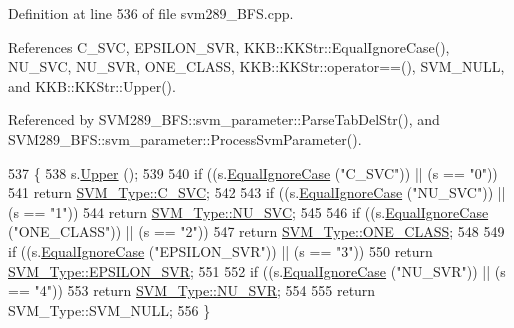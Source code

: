 Definition at line 536 of file svm289\+\_\+\+B\+F\+S.\+cpp.



References C\+\_\+\+S\+VC, E\+P\+S\+I\+L\+O\+N\+\_\+\+S\+VR, K\+K\+B\+::\+K\+K\+Str\+::\+Equal\+Ignore\+Case(), N\+U\+\_\+\+S\+VC, N\+U\+\_\+\+S\+VR, O\+N\+E\+\_\+\+C\+L\+A\+SS, K\+K\+B\+::\+K\+K\+Str\+::operator==(), S\+V\+M\+\_\+\+N\+U\+LL, and K\+K\+B\+::\+K\+K\+Str\+::\+Upper().



Referenced by S\+V\+M289\+\_\+\+B\+F\+S\+::svm\+\_\+parameter\+::\+Parse\+Tab\+Del\+Str(), and S\+V\+M289\+\_\+\+B\+F\+S\+::svm\+\_\+parameter\+::\+Process\+Svm\+Parameter().


\begin{DoxyCode}
537 \{
538   s.\hyperlink{class_k_k_b_1_1_k_k_str_a66ea0feabc94da88591b56a683695bd9}{Upper} ();
539 
540   \textcolor{keywordflow}{if}  ((s.\hyperlink{class_k_k_b_1_1_k_k_str_a562f9696417c53f66bc4088eac072ab5}{EqualIgnoreCase} (\textcolor{stringliteral}{"C\_SVC"}))       ||  (s == \textcolor{stringliteral}{"0"}))
541     \textcolor{keywordflow}{return} \hyperlink{namespace_s_v_m233_acde4c278f323c82a6b41c27f6f30738aa942f03bda3ae7dbb9e945f161c95ab97}{SVM\_Type::C\_SVC};
542 
543   \textcolor{keywordflow}{if}  ((s.\hyperlink{class_k_k_b_1_1_k_k_str_a562f9696417c53f66bc4088eac072ab5}{EqualIgnoreCase} (\textcolor{stringliteral}{"NU\_SVC"}))       ||  (s == \textcolor{stringliteral}{"1"}))
544     \textcolor{keywordflow}{return} \hyperlink{namespace_s_v_m233_acde4c278f323c82a6b41c27f6f30738aa7705bf71b9d3c7169b4d201acb2b30b8}{SVM\_Type::NU\_SVC};
545 
546   \textcolor{keywordflow}{if}  ((s.\hyperlink{class_k_k_b_1_1_k_k_str_a562f9696417c53f66bc4088eac072ab5}{EqualIgnoreCase} (\textcolor{stringliteral}{"ONE\_CLASS"}))    ||  (s == \textcolor{stringliteral}{"2"}))
547     \textcolor{keywordflow}{return}  \hyperlink{namespace_s_v_m233_acde4c278f323c82a6b41c27f6f30738aaea64d54fb16ebcd95d48c4aef97036df}{SVM\_Type::ONE\_CLASS};
548 
549   \textcolor{keywordflow}{if}  ((s.\hyperlink{class_k_k_b_1_1_k_k_str_a562f9696417c53f66bc4088eac072ab5}{EqualIgnoreCase} (\textcolor{stringliteral}{"EPSILON\_SVR"}))  ||  (s == \textcolor{stringliteral}{"3"}))
550     \textcolor{keywordflow}{return}  \hyperlink{namespace_s_v_m233_acde4c278f323c82a6b41c27f6f30738aae7f29e93ef95067dcc6827e4fe3071c7}{SVM\_Type::EPSILON\_SVR};
551 
552   \textcolor{keywordflow}{if}  ((s.\hyperlink{class_k_k_b_1_1_k_k_str_a562f9696417c53f66bc4088eac072ab5}{EqualIgnoreCase} (\textcolor{stringliteral}{"NU\_SVR"}))       ||  (s == \textcolor{stringliteral}{"4"}))
553     \textcolor{keywordflow}{return}  \hyperlink{namespace_s_v_m233_acde4c278f323c82a6b41c27f6f30738aaa9c624ae638f160fb1f00081960014b6}{SVM\_Type::NU\_SVR};
554 
555   \textcolor{keywordflow}{return}  SVM\_Type::SVM\_NULL;
556 \}
\end{DoxyCode}
